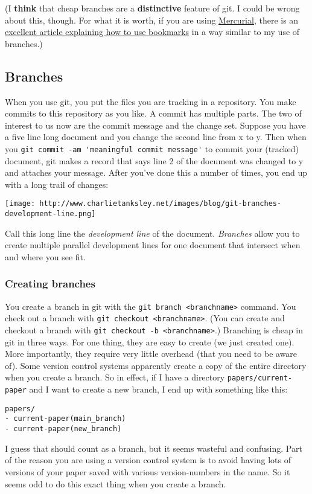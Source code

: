 \documentclass{article}
\begin{document}
(I \textbf{think} that cheap branches are a \textbf{distinctive}
feature of git. I could be wrong about this, though. For what it is
worth, if you are using
\href{http://mercurial.selenic.com/}{Mercurial}, there is an
\href{http://stevelosh.com/blog/2009/08/a-guide-to-branching-in-mercurial/}{excellent article explaining how to use bookmarks}
in a way similar to my use of branches.)

\subsection{Branches}

When you use git, you put the files you are tracking in a
repository. You make commits to this repository as you like. A
commit has multiple parts. The two of interest to us now are the
commit message and the change set. Suppose you have a five line
long document and you change the second line from x to y. Then when
you \verb!git commit -am 'meaningful commit message'! to commit
your (tracked) document, git makes a record that says line 2 of the
document was changed to y and attaches your message. After you've
done this a number of times, you end up with a long trail of
changes:

\texttt{[image: http://www.charlietanksley.net/images/blog/git-branches-development-line.png]}

Call this long line the \emph{development line} of the document.
\emph{Branches} allow you to create multiple parallel development
lines for one document that intersect when and where you see fit.

\subsubsection{Creating branches}

You create a branch in git with the \verb!git branch <branchname>!
command. You check out a branch with
\verb!git checkout <branchname>!. (You can create and checkout a
branch with \verb!git checkout -b <branchname>!.) Branching is
cheap in git in three ways. For one thing, they are easy to create
(we just created one). More importantly, they require very little
overhead (that you need to be aware of). Some version control
systems apparently create a copy of the entire directory when you
create a branch. So in effect, if I have a directory
\verb!papers/current-paper! and I want to create a new branch, I
end up with something like this:

\begin{verbatim}
papers/
- current-paper(main_branch)
- current-paper(new_branch)
\end{verbatim}
I guess that should count as a branch, but it seems wasteful and
confusing. Part of the reason you are using a version control
system is to avoid having lots of versions of your paper saved with
various version-numbers in the name. So it seems odd to do this
exact thing when you create a branch.
\end{document}
